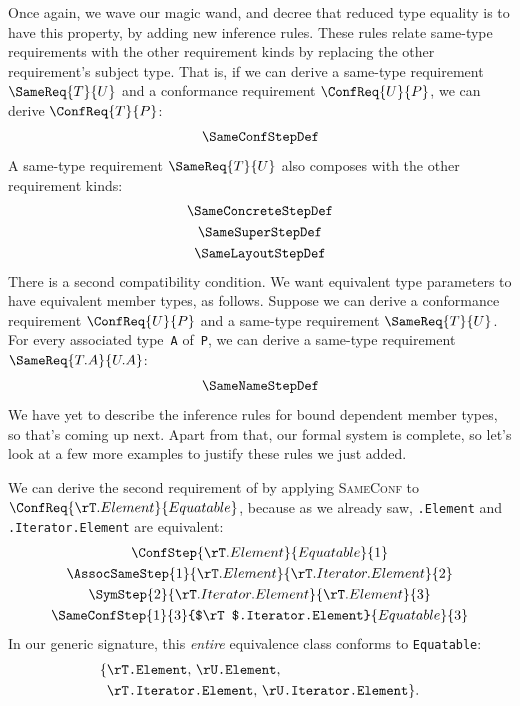 \documentclass[../generics]{subfiles}
\begin{document}
Once again, we wave our magic wand, and decree that reduced type equality is to have this property, by adding new inference rules. These rules relate same-type requirements with the other requirement kinds by replacing the other requirement's subject type. That is, if we can derive a same-type requirement $\SameReq{T}{U}$ and a conformance requirement $\ConfReq{U}{P}$, we can derive $\ConfReq{T}{P}$:
\begin{gather*}
\SameConfStepDef
\end{gather*}
A same-type requirement $\SameReq{T}{U}$ also composes with the other requirement kinds:
\begin{gather*}
\SameConcreteStepDef\\
\SameSuperStepDef\\
\SameLayoutStepDef
\end{gather*}
There is a second compatibility condition. We want equivalent type parameters to have equivalent member types, as follows. Suppose we can derive a conformance requirement $\ConfReq{U}{P}$ and a same-type requirement $\SameReq{T}{U}$. For every associated type~\texttt{A} of~\texttt{P}, we can derive a same-type requirement $\SameReq{T.A}{U.A}$:
\begin{gather*}
\SameNameStepDef
\end{gather*}
We have yet to describe the inference rules for bound dependent member types, so that's coming up next. Apart from that, our formal system is complete, so let's look at a few more examples to justify these rules we just added.

\begin{example}
We can derive the second requirement of  by applying \textsc{SameConf} to $\ConfReq{\rT.Element}{Equatable}$, because as we already saw, \texttt{\rT.Element} and \texttt{\rT.Iterator.Element} are equivalent:
\begin{gather*}
\ConfStep{\rT.Element}{Equatable}{1}\\
\AssocSameStep{1}{\rT.Element}{\rT.Iterator.Element}{2}\\
\SymStep{2}{\rT.Iterator.Element}{\rT.Element}{3}\\
\SameConfStep{1}{3}{$\rT$.Iterator.Element}{Equatable}{3}
\end{gather*}
In our generic signature, this \emph{entire} equivalence class conforms to \texttt{Equatable}:
\begin{align*}
\{&\texttt{\rT.Element},\,\texttt{\rU.Element},\,\\
&\texttt{\rT.Iterator.Element},\,\texttt{\rU.Iterator.Element}\}.
\end{align*}
\end{example}
\end{document}
